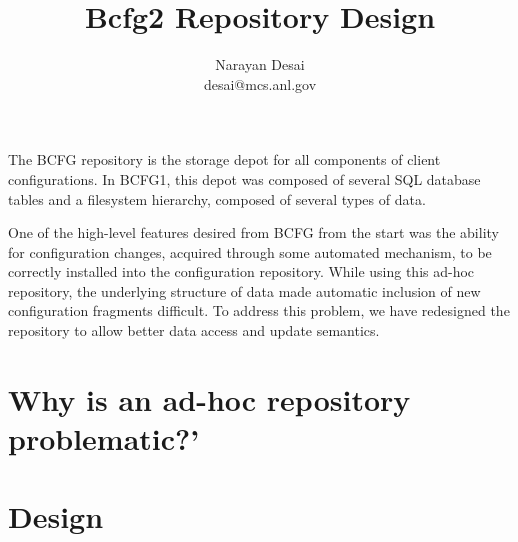 \documentclass[11pt]{article}
\title{Bcfg2 Repository Design}
\author{Narayan Desai \\ desai@mcs.anl.gov}
\begin{document}
\maketitle

The BCFG repository is the storage depot for all components of client
configurations. In BCFG1, this depot was composed of several SQL
database tables and a filesystem hierarchy, composed of several types
of data. 

One of the high-level features desired from BCFG from the start was
the ability for configuration changes, acquired through some automated
mechanism, to be correctly installed into the configuration
repository.  While using this ad-hoc repository, the underlying
structure of data made automatic inclusion of new configuration
fragments difficult. To address this problem, we have redesigned the
repository to allow better data access and update semantics. 

\section{Why is an ad-hoc repository problematic?'}

\section{Design}
\end{document}
